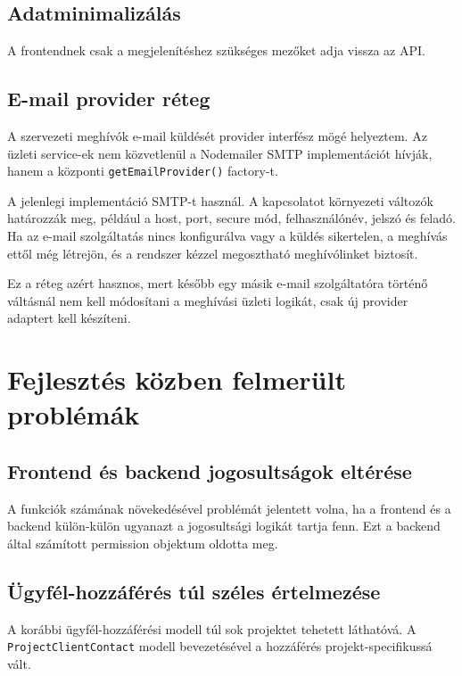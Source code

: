 \documentclass[11pt,a4paper]{report}
\begin{document}
    \section{Adatminimalizálás}

    A frontendnek csak a megjelenítéshez szükséges mezőket adja vissza az API.


    \section{E-mail provider réteg}

    A szervezeti meghívók e-mail küldését provider interfész mögé helyeztem. Az
    üzleti service-ek nem közvetlenül a Nodemailer SMTP implementációt hívják,
    hanem a központi \texttt{getEmailProvider()} factory-t.

    A jelenlegi implementáció SMTP-t használ. A kapcsolatot környezeti változók
    határozzák meg, például a host, port, secure mód, felhasználónév, jelszó és
    feladó. Ha az e-mail szolgáltatás nincs konfigurálva vagy a küldés sikertelen,
    a meghívás ettől még létrejön, és a rendszer kézzel megosztható meghívólinket
    biztosít.

    Ez a réteg azért hasznos, mert később egy másik e-mail szolgáltatóra történő
    váltásnál nem kell módosítani a meghívási üzleti logikát, csak új provider
    adaptert kell készíteni.


    \chapter{Fejlesztés közben felmerült problémák}

    \section{Frontend és backend jogosultságok eltérése}

    A funkciók számának növekedésével problémát jelentett volna, ha a frontend és
    a backend külön-külön ugyanazt a jogosultsági logikát tartja fenn. Ezt a
    backend által számított permission objektum oldotta meg.

    \section{Ügyfél-hozzáférés túl széles értelmezése}

    A korábbi ügyfél-hozzáférési modell túl sok projektet tehetett láthatóvá.
    A \texttt{ProjectClientContact} modell bevezetésével a hozzáférés
    projekt-specifikussá vált.
\end{document}
